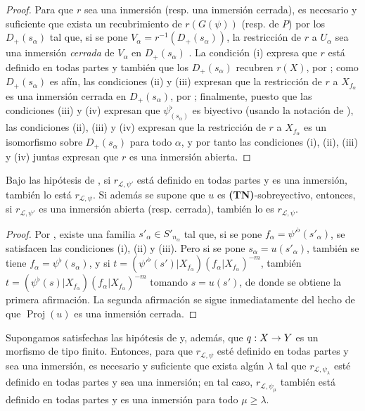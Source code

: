 \documentclass[oneside,10pt]{amsart}
\makeatletter
\renewcommand{\geq}{\geqslant}
\newcommand{\ega@arrow}[2]{\mathchoice{#1}{#2}{#2}{#2}}
\renewcommand{\to}{\ega@arrow{\longrightarrow}{\rightarrow}}
\let\EGAOriginalLabel\label
\renewcommand{\label}[1]{\phantomsection\EGAOriginalLabel{#1}}
\makeatother
\begin{document}
\begin{proof}
Para que $r$ sea una inmersión (resp. una inmersión cerrada), es necesario y suficiente que exista un recubrimiento de $r(G(\psi))$ (resp. de $P$) por los $D_+(s_\alpha)$ tal que, si se pone $V_\alpha=r^{-1}(D_+(s_\alpha))$, la restricción de $r$ a $U_\alpha$ sea una inmersión \emph{cerrada} de $V_\alpha$ en $D_+(s_\alpha)$ .
La condición (i) expresa que $r$ está definido en todas partes y también que los $D_+(s_\alpha)$ recubren $r(X)$, por ;
como $D_+(s_\alpha)$ es afín, las condiciones (ii) y (iii) expresan que la restricción de $r$ a $X_{f_\alpha}$ es una inmersión cerrada en $D_+(s_\alpha)$, por ;
finalmente, puesto que las condiciones (iii) y (iv) expresan que $\psi_{(s_\alpha)}^\flat$ es biyectivo (usando la notación de ), las condiciones (ii), (iii) y (iv) expresan que la restricción de $r$ a $X_{f_\alpha}$ es un isomorfismo sobre $D_+(s_\alpha)$ para todo $\alpha$, y por tanto las condiciones (i), (ii), (iii) y (iv) juntas expresan que $r$ es una inmersión abierta.
\end{proof}

\begin{corollary}[3.8.3]
\label{II.3.8.3-fr}
Bajo las hipótesis de , si $r_{\mathcal{L},\psi'}$ está definido en todas partes y es una inmersión, también lo está $r_{\mathcal{L},\psi}$.
Si además se supone que $u$ es \textup{\textbf{(TN)}}-sobreyectivo, entonces, si $r_{\mathcal{L},\psi'}$ es una inmersión abierta \textup{(resp.} cerrada\textup{)}, también lo es $r_{\mathcal{L},\psi}$.
\end{corollary}

\begin{proof}
Por , existe una familia $s'_\alpha\in S'_{n_\alpha}$ tal que, si se pone $f_\alpha=\psi'^\flat(s'_\alpha)$, se satisfacen las condiciones (i), (ii) y (iii).
Pero si se pone $s_\alpha=u(s'_\alpha)$, también se tiene $f_\alpha=\psi^\flat(s_\alpha)$, y si $t=(\psi'^\flat(s')|X_{f_\alpha})(f_\alpha|X_{f_\alpha})^{-m}$, también $t=(\psi^\flat(s)|X_{f_\alpha})(f_\alpha|X_{f_\alpha})^{-m}$ tomando $s=u(s')$, de donde se obtiene la primera afirmación.
La segunda afirmación se sigue inmediatamente del hecho de que $\operatorname{Proj}(u)$ es una inmersión cerrada.
\end{proof}

\begin{proposition}[3.8.4]
\label{II.3.8.4-fr}
Supongamos satisfechas las hipótesis de  y, además, que $q:X\to Y$ es un morfismo de tipo finito.
Entonces, para que $r_{\mathcal{L},\psi}$ esté definido en todas partes y sea una inmersión, es necesario y suficiente que exista algún $\lambda$ tal que $r_{\mathcal{L},\psi_\lambda}$ esté definido en todas partes y sea una inmersión;
en tal caso, $r_{\mathcal{L},\psi_\mu}$ también está definido en todas partes y es una inmersión para todo $\mu\geq\lambda$.
\end{proposition}
\end{document}
